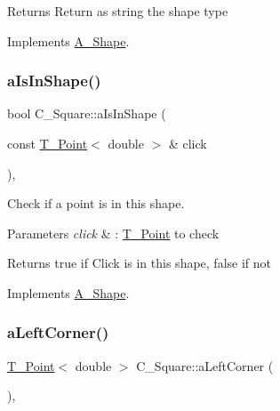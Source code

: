 \begin{DoxyReturn}{Returns}
Return as string the shape type 
\end{DoxyReturn}


Implements \hyperlink{classA__Shape_a1b202256a4e5dcb0edab4ab93a37122c}{A\+\_\+\+Shape}.

\mbox{\label{classC__Square_ac5ffad4afca051f117b43012fb4dc239}} 
\subsubsection{\texorpdfstring{a\+Is\+In\+Shape()}{aIsInShape()}}
{\footnotesize\ttfamily bool C\+\_\+\+Square\+::a\+Is\+In\+Shape (\begin{DoxyParamCaption}\item[{const \hyperlink{classT__Point}{T\+\_\+\+Point}$<$ double $>$ \&}]{click }\end{DoxyParamCaption})\hspace{0.3cm}{\ttfamily [override]}, {\ttfamily [virtual]}}



Check if a point is in this shape. 


\begin{DoxyParams}{Parameters}
{\em click} & \+: \hyperlink{classT__Point}{T\+\_\+\+Point} to check \\
\hline
\end{DoxyParams}
\begin{DoxyReturn}{Returns}
true if Click is in this shape, false if not 
\end{DoxyReturn}


Implements \hyperlink{classA__Shape_a63f825cbc9780208d9a137f5c14917d0}{A\+\_\+\+Shape}.

\mbox{\label{classC__Square_a13e97bb379f1678636e3baf781c2a01b}} 
\subsubsection{\texorpdfstring{a\+Left\+Corner()}{aLeftCorner()}}
{\footnotesize\ttfamily \hyperlink{classT__Point}{T\+\_\+\+Point}$<$ double $>$ C\+\_\+\+Square\+::a\+Left\+Corner (\begin{DoxyParamCaption}{ }\end{DoxyParamCaption})\hspace{0.3cm}{\ttfamily [override]}, {\ttfamily [virtual]}}



